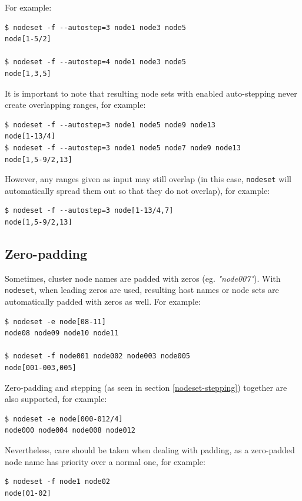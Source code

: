 \documentclass[english,a4paper]{csuserguide}
\newcommand{\nodeset}{\texttt{nodeset}\xspace}
\begin{document}
\newpage
For example:
\medskip
\begin{lstlisting}[breaklines=true, breakatwhitespace=true] 
$ nodeset -f --autostep=3 node1 node3 node5
node[1-5/2]

$ nodeset -f --autostep=4 node1 node3 node5
node[1,3,5]
\end{lstlisting}

It is important to note that resulting node sets with enabled auto-stepping never create overlapping ranges, for example:
\medskip
\begin{lstlisting}[breaklines=true, breakatwhitespace=true] 
$ nodeset -f --autostep=3 node1 node5 node9 node13
node[1-13/4]
$ nodeset -f --autostep=3 node1 node5 node7 node9 node13
node[1,5-9/2,13]
\end{lstlisting}

However, any ranges given as input may still overlap (in this case, \nodeset will automatically spread them out so that they do not overlap), for example:
\medskip
\begin{lstlisting}[breaklines=true, breakatwhitespace=true] 
$ nodeset -f --autostep=3 node[1-13/4,7]                
node[1,5-9/2,13]
\end{lstlisting}

\subsection{Zero-padding}
\label{nodeset-zpad}

Sometimes, cluster node names are padded with zeros (eg. \textit{"node007"}). With \nodeset, when leading zeros are used, resulting host names or node sets are automatically padded with zeros as well. For example:
\medskip
\begin{lstlisting}[breaklines=true, breakatwhitespace=true]
$ nodeset -e node[08-11]
node08 node09 node10 node11

$ nodeset -f node001 node002 node003 node005
node[001-003,005]
\end{lstlisting}

Zero-padding and stepping (as seen in section \ref{nodeset-stepping}) together are also supported, for example:
\medskip
\begin{lstlisting}[breaklines=true, breakatwhitespace=true]
$ nodeset -e node[000-012/4]
node000 node004 node008 node012
\end{lstlisting}

Nevertheless, care should be taken when dealing with padding, as a zero-padded node name has priority over a normal one, for example:
\medskip
\begin{lstlisting}[breaklines=true, breakatwhitespace=true]
$ nodeset -f node1 node02
node[01-02]
\end{lstlisting}
\end{document}
